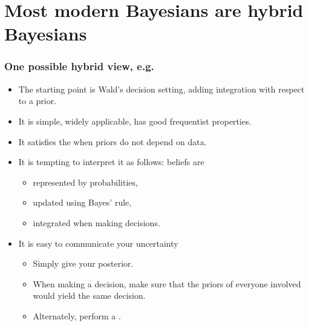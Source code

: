 \documentclass[10pt]{beamer}
\begin{document}
\section{Most modern Bayesians are hybrid Bayesians}
\begin{frame}
  \frametitle{One possible hybrid view, e.g. \citep{Rob07}}
  \begin{itemize}
    \item The starting point is Wald's decision setting, adding integration with respect to a prior.
    \item It is simple, widely applicable, has good frequentist properties.
    \item It satisfies the  when priors do not depend on data.
    \item It is tempting to interpret it as follows: beliefs are
    \begin{itemize}
      \item represented by probabilities,
      \item updated using Bayes' rule,
      \item integrated when making decisions.
    \end{itemize}
    \item It is easy to communicate your uncertainty
    \begin{itemize}
      \item Simply give your posterior.
      \item When making a decision, make sure that the priors of everyone involved would yield the same decision.
      \item Alternately, perform a .
    \end{itemize}
  \end{itemize}
\end{frame}
\end{document}
